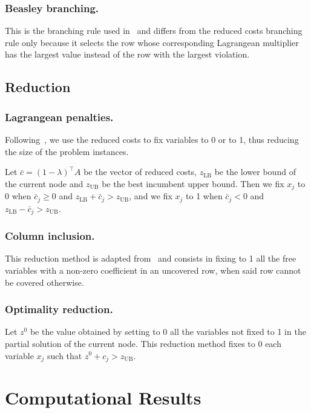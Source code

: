\documentclass[runningheads]{llncs}
\begin{document}
\subsubsection{Beasley branching.} This is the branching rule used in~\cite{beasley-1987-algorithm} and differs from the reduced costs branching rule only because it selects the row whose corresponding Lagrangean multiplier has the largest value instead of the row with the largest violation.

\subsection{Reduction}
\label{subsec:branch-bound:reduction}

\subsubsection{Lagrangean penalties.} Following~\cite{beasley-1987-algorithm}, we use the reduced costs to fix variables to 0 or to 1, thus reducing the size of the problem instances. 

Let $\bar{c} = (1 - \lambda)^\top A$ be the vector of reduced costs, $z_{\text{LB}}$ be the lower bound of the current node and $z_{\text{UB}}$ be the best incumbent upper bound. Then we fix $x_j$ to 0 when $\bar{c}_j \ge 0$ and $z_{\text{LB}} + \bar{c}_j > z_{\text{UB}}$, and we fix $x_j$ to 1 when $\bar{c}_j < 0$ and $z_{\text{LB}} - \bar{c}_j > z_{\text{UB}}$.  

\subsubsection{Column inclusion.} This reduction method is adapted from~\cite{beasley-1987-algorithm} and consists in fixing to 1 all the free variables with a non-zero coefficient in an uncovered row, when said row cannot be covered otherwise.

\subsubsection{Optimality reduction.} Let $z^0$ be the value obtained by setting to 0 all the variables not fixed to 1 in the partial solution of the current node. This reduction method fixes to 0 each variable $x_j$ such that $z^0 + c_j > z_{\text{UB}}$.

\section{Computational Results}
\label{sec:results}
\end{document}
